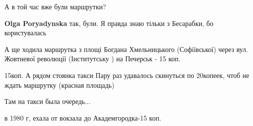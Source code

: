 А в той час вже були маршрутки?

\textbf{Olga Poryadynska} так, були. Я правда знаю тільки з Бесарабки, бо користувалась


А ще ходила маршрутка з площі Богдана Хмельницького (Софіївської) через вул.
Жовтневої революції (Інститутську ) на Печерськ - 15 коп.

15коп.
А рядом стоянка такси
Пару раз удавалось скинуться по 20копеек, чтоб не ждать маршрутку (красная площадь)

Там на такси была очередь...

в 1980 г, ехала от вокзала до Академгородка-15 коп.
